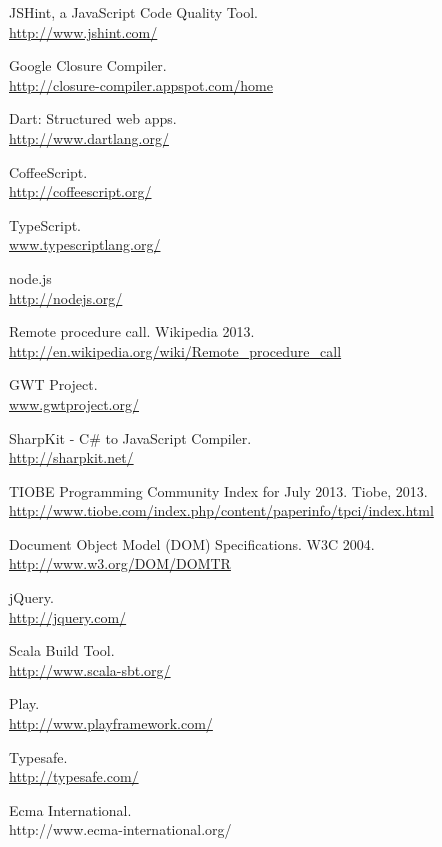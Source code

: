 \begin{thebibliography}{99}
	JSHint, a JavaScript Code Quality Tool.\\
	\url{http://www.jshint.com/}

	Google Closure Compiler.\\
	\url{http://closure-compiler.appspot.com/home}
	
	Dart: Structured web apps.\\
	\url{http://www.dartlang.org/}
	
	CoffeeScript.\\
	\url{http://coffeescript.org/}
	
	TypeScript.\\
	\url{www.typescriptlang.org/}
	
	node.js\\
	\url{http://nodejs.org/}
	
	Remote procedure call. Wikipedia 2013.\\
	\url{http://en.wikipedia.org/wiki/Remote\_procedure\_call}
	
	GWT Project.\\
	\url{www.gwtproject.org/}
	
	SharpKit - C\# to JavaScript Compiler.\\
	\url{http://sharpkit.net/}
	
	TIOBE Programming Community Index for July 2013. Tiobe, 2013.\\
	\url{http://www.tiobe.com/index.php/content/paperinfo/tpci/index.html}
	
	Document Object Model (DOM) Specifications. W3C 2004.\\
	\url{http://www.w3.org/DOM/DOMTR}
		
	jQuery.\\
	\url{http://jquery.com/}
	
	Scala Build Tool.\\
	\url{http://www.scala-sbt.org/}
	
	Play.\\
	\url{http://www.playframework.com/}
	
	Typesafe.\\
	\url{http://typesafe.com/}
	
  Ecma International.\\
	http://www.ecma-international.org/
	

\end{thebibliography}
